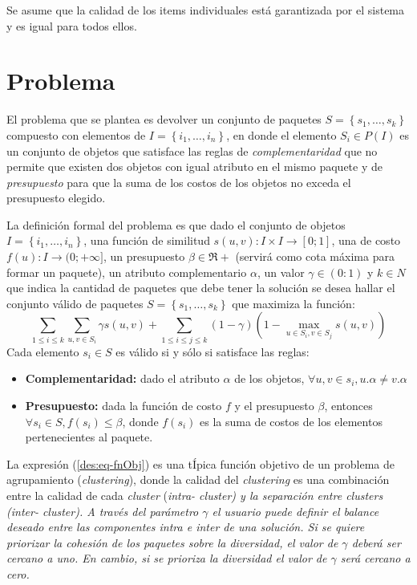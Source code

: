 Se asume que la calidad de los items individuales está garantizada por el sistema y es igual para todos ellos. 

\section{Problema}
El problema que se plantea es devolver un conjunto de paquetes $S = \left\{s_1, \ldots, s_k\right\}$ compuesto con elementos de $I=\left\{i_1,\ldots, i_n\right\}$, en donde el elemento $S_i \in P(I)$ es un conjunto de objetos que satisface las reglas de \textit{complementaridad} que no permite que existen dos objetos con igual atributo en el mismo paquete y de \textit{presupuesto} para que la suma de los costos de los objetos no exceda el presupuesto elegido.

La definición formal del problema es que dado el conjunto de objetos $I=\left\{i_1,\ldots, i_n\right\}$, una función de similitud $s(u,v): I \times I \rightarrow [0;1]$, una de costo $f(u): I \rightarrow (0;+\infty]$, un presupuesto $\beta \in \Re+$ (servirá como cota máxima para formar un paquete), un atributo complementario $\alpha$, un valor $\gamma \in (0:1)$ y $k \in N$ que indica la cantidad de paquetes que debe tener la solución se desea hallar el conjunto válido de paquetes $S = \left\{s_1, \ldots, s_k\right\}$ que maximiza la función:
\begin{equation} \label{des:eq-fnObj}
\sum_{1 \leq i \leq k}{\sum_{u,v \in S_i}{\gamma s(u,v)}} + \sum_{1 \leq i \leq j \leq k}{(1-\gamma) (1-\max_{u \in S_i, v \in S_j}{s(u,v)})}
\end{equation}
Cada elemento $s_i \in S$ es válido si y sólo si satisface las reglas:
\begin{itemize}
	\item \textbf{Complementaridad:} dado el atributo $\alpha$ de los objetos, $\forall u,v \in s_i, u.\alpha \neq v.\alpha$
	\item \textbf{Presupuesto:} dada la función de costo $f$ y el presupuesto $\beta$, entonces $\forall s_i \in S, f(s_i) \leq \beta$, donde $f(s_i)$ es la suma de costos de los elementos pertenecientes al paquete.
\end{itemize}		  


La expresión (\ref{des:eq-fnObj}) es una tÍpica función objetivo de un problema de agrupamiento ({\em clustering}), donde la calidad del {\em clustering} es una combinación entre la calidad de cada {\em cluster} (\em{intra}- cluster) y la separación entre {\em clusters} (\em{inter}- cluster). A través del parámetro $\gamma$ el usuario puede definir el balance deseado entre las componentes intra e inter de una solución. Si se quiere priorizar la cohesión de los paquetes sobre la diversidad, el  valor de $\gamma$ deberá ser cercano a uno. En cambio, si se prioriza la diversidad el valor de $\gamma$ será cercano a cero.

